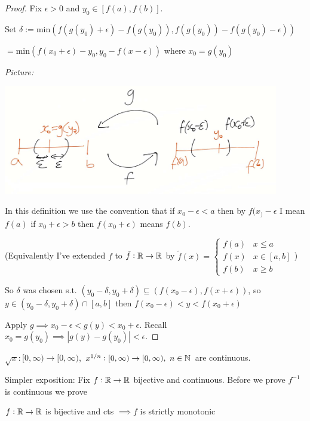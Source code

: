 \begin{proof}
Fix $\epsilon >0$ and $y_0 \in [f(a),f(b)]$. 

Set $\delta:= \mathrm{min}(f(g(y_0) + \epsilon) - f(g(y_0)), f(g(y_0)) - f(g(y_0) - \epsilon))$

$ = \mathrm{min}(f(x_0 + \epsilon) -  y_0, y_0 - f(x-\epsilon))$	 where $x_0 = g(y_0)$

\emph{Picture:} 
\begin{center}
\includegraphics[width = 12cm]{ball2.jpg}
\end{center}

In this definition we use the convention that if $x_0 -\epsilon <a$ then by $f(x_) - \epsilon$ I mean $f(a)$ if $x_0 + \epsilon > b$ then $f(x_0 + \epsilon)$ means $f(b)$. 

(Equivalently I've extended $f$ to $\tilde f: \mathbb{R} \to \mathbb{R}$ by $\tilde f(x) =\begin{cases}
f(a) & x \leq a\\
f(x) & x \in [a,b]\\
f(b) & x \geq b
\end{cases}
$)

So $\delta$ was chosen s.t. $(y_0 -\delta, y_0 + \delta) \subseteq (f(x_0 - \epsilon), f(x+\epsilon))$, so $y \in (y_0 - \delta, y_0 + \delta) \cap [a,b]$ then $f(x_0 -\epsilon) < y < f(x_0 + \epsilon)$

Apply $g\implies x_0 -\epsilon < g(y) < x_0 + \epsilon$. Recall $x_0 = g(y_0) \implies |g(y) - g(y_0)| < \epsilon$.
\end{proof}

\begin{corollary}
$\sqrt{x}: [0,\infty) \to [0,\infty)$, $x^{1/n}: [0,\infty) \to [0,\infty),~n\in\mathbb{N}$ are continuous. 	
\end{corollary}

Simpler exposition: Fix $f: \mathbb{R} \to \mathbb{R}$ bijective and continuous. Before we prove $f^{-1}$ is continuous we prove

\begin{lemma}
$f:\mathbb{R} \to \mathbb{R}$ is bijective and cts $\implies f$ is strictly monotonic	
\end{lemma}


